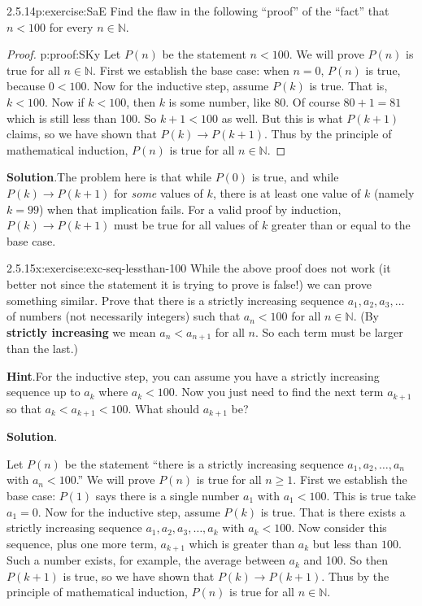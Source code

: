 \documentclass[twoside,11pt,]{book}
\newcommand{\blocktitlefont}{\relax}
\newcommand{\terminology}[1]{\textbf{#1}}
\numberwithin{equation}{chapter}
\newcommand{\N}{\mathbb N}
\newcommand{\imp}{\rightarrow}
\newcommand{\lt}{<}
\begin{document}
\begin{divisionsolution}{2.5.14}{}{p:exercise:SaE}%
Find the flaw in the following ``proof'' of the ``fact'' that \(n \lt 100\) for every \(n \in \N\).%
\begin{proof}{}{p:proof:SKy}
Let \(P(n)\) be the statement \(n \lt 100\). We will prove \(P(n)\) is true for all \(n \in \N\). First we establish the base case: when \(n = 0\), \(P(n)\) is true, because \(0 \lt 100\). Now for the inductive step, assume \(P(k)\) is true. That is, \(k \lt 100\). Now if \(k \lt 100\), then \(k\) is some number, like 80. Of course \(80+1 = 81\) which is still less than 100. So \(k +1 \lt 100\) as well. But this is what \(P(k+1)\) claims, so we have shown that \(P(k) \imp P(k+1)\). Thus by the principle of mathematical induction, \(P(n)\) is true for all \(n \in \N\).%
\end{proof}
\par\smallskip%
\noindent\textbf{\blocktitlefont Solution}.\quad{}The problem here is that while \(P(0)\) is true, and while \(P(k) \imp P(k+1)\) for \emph{some} values of \(k\), there is at least one value of \(k\) (namely \(k = 99\)) when that implication fails. For a valid proof by induction, \(P(k) \imp P(k+1)\) must be true for all values of \(k\) greater than or equal to the base case.%
\end{divisionsolution}%
\begin{divisionsolution}{2.5.15}{}{x:exercise:exc-seq-lessthan-100}%
While the above proof does not work (it better not since the statement it is trying to prove is false!) we can prove something similar. Prove that there is a strictly increasing sequence \(a_1, a_2, a_3, \ldots\) of numbers (not necessarily integers) such that \(a_n \lt 100\) for all \(n \in \N\). (By \terminology{strictly increasing} we mean \(a_n \lt a_{n+1}\) for all \(n\). So each term must be larger than the last.)%
\par\smallskip%
\noindent\textbf{\blocktitlefont Hint}.\quad{}For the inductive step, you can assume you have a strictly increasing sequence up to \(a_k\) where \(a_k \lt 100\).  Now you just need to find the next term \(a_{k+1}\) so that \(a_{k} \lt a_{k+1} \lt 100\).  What should \(a_{k+1}\) be?%
\par\smallskip%
\noindent\textbf{\blocktitlefont Solution}.\quad{}\begin{solutionproof}
Let \(P(n)\) be the statement ``there is a strictly increasing sequence \(a_1, a_2, \ldots,
a_n\) with \(a_n \lt 100\).'' We will prove \(P(n)\) is true for all \(n \ge 1\). First we establish the base case: \(P(1)\) says there is a single number \(a_1\) with \(a_1 \lt 100\). This is true \textendash{} take \(a_1 = 0\). Now for the inductive step, assume \(P(k)\) is true. That is there exists a strictly increasing sequence \(a_1, a_2, a_3, \ldots,
a_k\) with \(a_k \lt 100\). Now consider this sequence, plus one more term, \(a_{k+1}\) which is greater than \(a_k\) but less than \(100\). Such a number exists, for example, the average between \(a_k\) and 100. So then \(P(k+1)\) is true, so we have shown that \(P(k) \imp P(k+1)\). Thus by the principle of mathematical induction, \(P(n)\) is true for all \(n \in \N\).%
\end{solutionproof}
\end{divisionsolution}%
\end{document}

